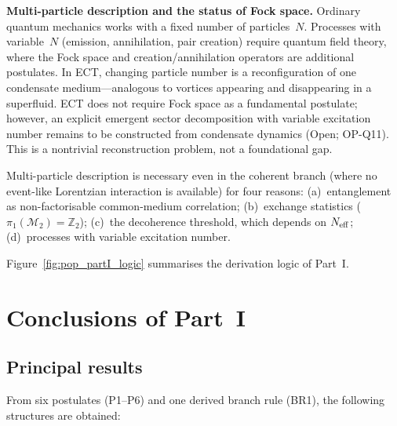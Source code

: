 \documentclass[11pt,a4paper]{article}
\begin{document}
\textbf{Multi-particle description and the status of Fock space.}
Ordinary quantum mechanics works with a fixed number of particles~$N$. Processes with variable~$N$ (emission, annihilation, pair creation) require quantum field theory, where the Fock space and creation/annihilation operators are additional postulates. In ECT, changing particle number is a reconfiguration of one condensate medium---analogous to vortices appearing and disappearing in a superfluid. ECT does not require Fock space as a fundamental postulate; however, an explicit emergent sector decomposition with variable excitation number remains to be constructed from condensate dynamics (Open; OP-Q11). This is a nontrivial reconstruction problem, not a foundational gap.

Multi-particle description is necessary even in the coherent branch (where no event-like Lorentzian interaction is available) for four reasons: (a)~entanglement as non-factorisable common-medium correlation; (b)~exchange statistics ($\pi_1(\mathcal{M}_2)=\mathbb{Z}_2$); (c)~the decoherence threshold, which depends on $N_{\rm eff}$; (d)~processes with variable excitation number.

Figure~\ref{fig:pop_partI_logic} summarises the derivation logic of Part~I.


\section{Conclusions of Part~I}

\subsection{Principal results}

From six postulates (P1--P6) and one derived branch rule (BR1), the following structures are obtained:
\end{document}
